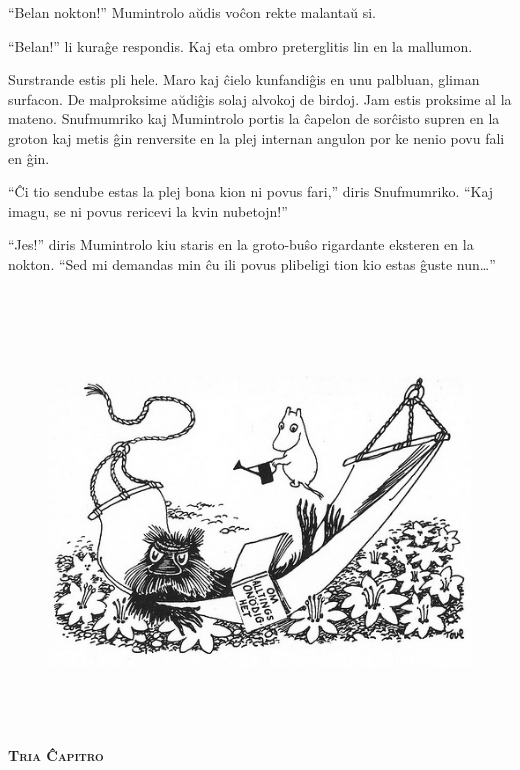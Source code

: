 ``Belan nokton!'' Mumintrolo aŭdis voĉon rekte malantaŭ si.

``Belan!'' li kuraĝe respondis. Kaj eta ombro preterglitis lin en la mallumon.

Surstrande estis pli hele. Maro kaj ĉielo kunfandiĝis en unu palbluan, gliman surfacon. De malproksime aŭdiĝis solaj alvokoj de birdoj. Jam estis proksime al la mateno. Snufmumriko kaj Mumintrolo portis la ĉapelon de sorĉisto supren en la groton kaj metis ĝin renversite en la plej internan angulon por ke nenio povu fali en ĝin.

``Ĉi tio sendube estas la plej bona kion ni povus fari,'' diris Snufmumriko. ``Kaj imagu, se ni povus rericevi la kvin nubetojn!''

``Jes!'' diris Mumintrolo kiu staris en la groto-buŝo rigardante eksteren en la nokton. ``Sed mi demandas min ĉu ili povus plibeligi tion kio estas ĝuste nun{\ldots}''

\chapter[Tria Ĉapitro]{}


\begin{figure}[htbp]
\centering
\includegraphics[width=450pt,height=310pt]{_12.jpg}
\caption{}
\label{_12}
\end{figure}

\begin{center}\textbf{\Large\color{ForestGreen}\textsc{Tria Ĉapitro}}\end{center}

